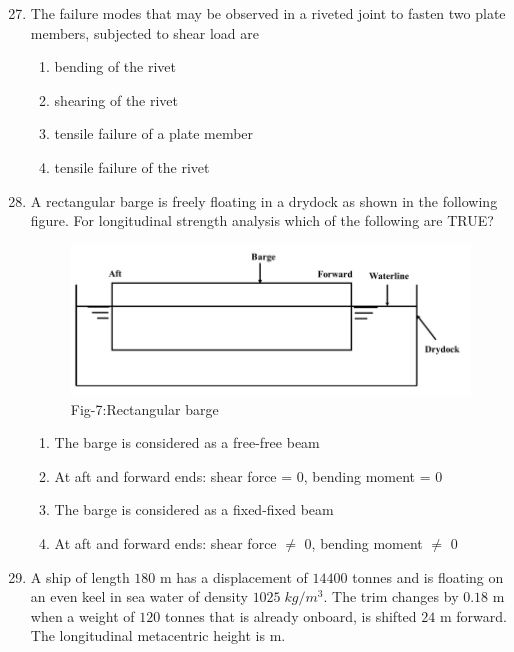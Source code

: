 \documentclass[journal]{IEEEtran}
\theoremstyle{remark}
\begin{document}
\begin{enumerate}[itemsep=1em]
\setcounter{enumi}{26}
\item The failure modes that may be observed in a riveted joint to fasten two plate members, subjected to shear load are  
\begin{enumerate}[leftmargin=2.5em, labelsep=0.5em, itemsep=0.5em]
        \item bending of the rivet 
        \item shearing of the rivet 
        \item tensile failure of a plate member 
        \item tensile failure of the rivet 
\end{enumerate}
\end{enumerate}

\begin{enumerate}[itemsep=1em]
\setcounter{enumi}{27}
\item A rectangular barge is freely floating in a drydock as shown in the following figure. For longitudinal strength analysis which of the following are TRUE?  
\begin{figure}[H]
    \centering
    \includegraphics[width=0.6\columnwidth]{figs/fig-7.jpeg}
    \caption*{Fig-7:Rectangular barge}
    \label{fig-7}
\end{figure}
\begin{enumerate}[leftmargin=2.5em, labelsep=0.5em, itemsep=0.5em]
     \item The barge is considered as a free-free beam 
     \item At aft and forward ends: shear force = $0$, bending moment = $0$
     \item The barge is considered as a fixed-fixed beam 
     \item At aft and forward ends: shear force $\neq$ $0$, bending moment $\neq$ $0$
\end{enumerate}
\end{enumerate}

\begin{enumerate}[itemsep=1em]
\setcounter{enumi}{28}
\item A ship of length $180$ m has a displacement of $14400$ tonnes and is floating on an even keel in sea water of density $1025\; kg/m^3$. The trim changes by $0.18$ m when a weight of $120$ tonnes that is already onboard, is shifted $24$ m forward. The longitudinal metacentric height is \underline{\hspace{2cm}} m. 
\end{enumerate}
\end{document}
